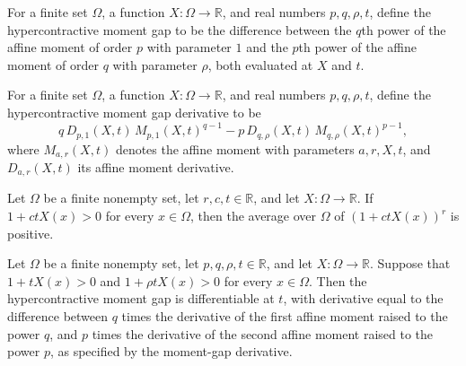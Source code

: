 \begin{definition}
\label{FABL.hypercontractiveMomentGap}
\leanok
{}
For a finite set $\Omega$, a function $X\colon\Omega\to\mathbb{R}$, and real numbers
$p,q,\rho,t$, define the hypercontractive moment gap to be the difference between the
$q$th power of the affine moment of order $p$ with parameter $1$ and the $p$th power of
the affine moment of order $q$ with parameter $\rho$, both evaluated at $X$ and $t$.
\end{definition}

\begin{definition}
\label{FABL.hypercontractiveMomentGapDeriv}
\leanok
{}
For a finite set $\Omega$, a function $X:\Omega\to\mathbb{R}$, and real numbers
$p,q,\rho,t$, define the hypercontractive moment gap derivative to be
\[
q\,D_{p,1}(X,t)\,M_{p,1}(X,t)^{q-1}-p\,D_{q,\rho}(X,t)\,M_{q,\rho}(X,t)^{p-1},
\]
where $M_{a,r}(X,t)$ denotes the affine moment with parameters $a,r,X,t$, and
$D_{a,r}(X,t)$ its affine moment derivative.
\end{definition}

\begin{theorem}
\label{FABL.affineMoment_pos}
\leanok
{}
Let $\Omega$ be a finite nonempty set, let $r,c,t\in\mathbb R$, and let
$X:\Omega\to\mathbb R$. If $1+ctX(x)>0$ for every $x\in\Omega$, then the average over
$\Omega$ of $(1+ctX(x))^r$ is positive.
\end{theorem}

\begin{theorem}
\label{FABL.hypercontractiveMomentGap_hasDerivAt}
\leanok
{}
Let $\Omega$ be a finite nonempty set, let $p,q,\rho,t\in\mathbb R$, and let
$X:\Omega\to\mathbb R$. Suppose that $1+tX(x)>0$ and $1+\rho tX(x)>0$ for every
$x\in\Omega$. Then the hypercontractive moment gap is differentiable at $t$, with
derivative equal to the difference between $q$ times the derivative of the first affine
moment raised to the power $q$, and $p$ times the derivative of the second affine moment
raised to the power $p$, as specified by the moment-gap derivative.
\end{theorem}

